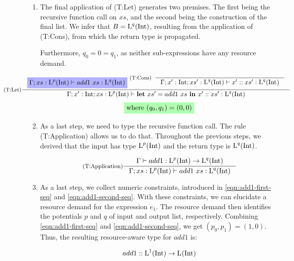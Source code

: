 \begin{example}
\begin{enumerate}[label=Step \Roman*:]
   \item The final application of (T:Let) generates two premises. The first being the recursive function call on \(xs\), and the second being the construction of the final list. We infer that \(B = \text{L}^{q}(\text{Int})\), resulting from the application of (T:Cons), from which the return type is propagated. 

Furthermore, \(q_0 = 0 = q_1\), as neither sub-expressions have any resource demand.

\[
   \hspace*{-2cm}
   \inference[(T:Let)]
   {
      \typingHighlight{\typing{\Gamma;xs:\ralist{p}{\typeint}}{add1~xs}{\ralist{q}{\typeint}}}
      \inference[(T:Cons)]
      {}
      {
         \typing{\Gamma;x':\typeint;xs':\ralist{q}{\typeint}}{\cons{x'}{xs'}}{\ralist{q}{\typeint}}
      }
   }
   {
      \typing{\Gamma;x':\typeint;xs:\ralist{p}{\typeint}}{\letexp{xs'}{add1~xs}{\cons{x'}{xs'}}}{\ralist{q}{\typeint}}
   }
\]
\begin{align}
   \constraintHighlight{\text{where } (q_0, q_1) = (0, 0)} \label{eqn:add1-second-seq}
\end{align}

   \item As a last step, we need to type the recursive function call. The rule (T:Application) allows us to do that. Throughout the previous steps, we derived that the input has type \(\text{L}^{p}(\text{Int})\) and the return type is \(\text{L}^{q}(\text{Int})\). 

\[
   \inference[(T:Application)]
   {
      \typing{\Gamma}{add1}{\ralist{p}{\typeint} \to \ralist{q}{\typeint}}
   }
   {
      \typing{\Gamma;xs:\ralist{p}{\typeint}}{add1~xs}{\ralist{q}{\typeint}}
   }
\]

\item As a last step, we collect numeric constraints, introduced in \cref{eqn:add1-first-seq} and \cref{eqn:add1-second-seq}. With these constraints, we can elucidate a resource demand for the expression \(e_1\). The resource demand then identifies the potentials \(p\) and \(q\) of input and output list, respectively. Combining \cref{eqn:add1-first-seq} and \cref{eqn:add1-second-seq}, we get \((p_0, p_1) = (1, 0)\). Thus, the resulting resource-aware type for \(add1\) is:

\[
   add1 :: \text{L}^{1}(\text{Int}) \to \text{L}^{}(\text{Int}) ^{}_{}
\]
\end{enumerate}
\end{example}

